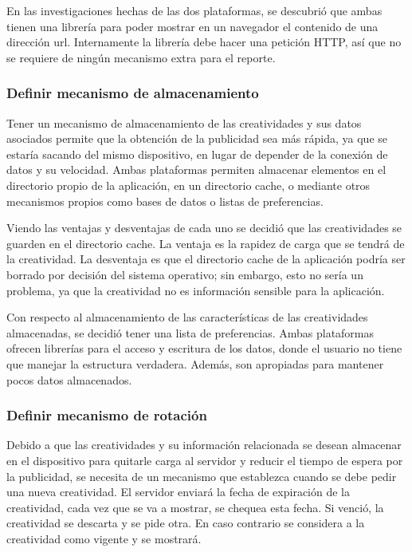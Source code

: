En las investigaciones hechas de las dos plataformas, se descubrió
que ambas tienen una librería para poder mostrar en un navegador el
contenido de una dirección url. Internamente la librería debe hacer
una petición HTTP, así que no se requiere de ningún mecanismo extra
para el reporte.


\subsubsection{Definir mecanismo de almacenamiento}

Tener un mecanismo de almacenamiento de las creatividades y sus datos
asociados permite que la obtención de la publicidad sea más rápida,
ya que se estaría sacando del mismo dispositivo, en lugar de depender
de la conexión de datos y su velocidad. Ambas plataformas permiten
almacenar elementos en el directorio propio de la aplicación, en un
directorio cache, o mediante otros mecanismos propios como bases de
datos o listas de preferencias. 

Viendo las ventajas y desventajas de cada uno se decidió que las creatividades
se guarden en el directorio cache. La ventaja es la rapidez de carga
que se tendrá de la creatividad. La desventaja es que el directorio
cache de la aplicación podría ser borrado por decisión del sistema
operativo; sin embargo, esto no sería un problema, ya que la creatividad
no es información sensible para la aplicación. 

Con respecto al almacenamiento de las características de las creatividades
almacenadas, se decidió tener una lista de preferencias. Ambas plataformas
ofrecen librerías para el acceso y escritura de los datos, donde el
usuario no tiene que manejar la estructura verdadera. Además, son
apropiadas para mantener pocos datos almacenados. 


\subsubsection{Definir mecanismo de rotación\label{rotacion}}

Debido a que las creatividades y su información relacionada se desean
almacenar en el dispositivo para quitarle carga al servidor y reducir
el tiempo de espera por la publicidad, se necesita de un mecanismo
que establezca cuando se debe pedir una nueva creatividad. El servidor
enviará la fecha de expiración de la creatividad, cada vez que se
va a mostrar, se chequea esta fecha. Si venció, la creatividad se
descarta y se pide otra. En caso contrario se considera a la creatividad
como vigente y se mostrará. 

